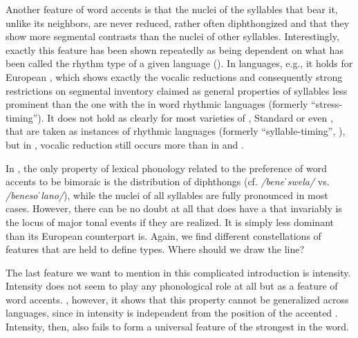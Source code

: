 \documentclass[output=paper]{LSP/langsci}
\begin{document}
Another feature of word accents is that the nuclei of the syllables that bear it, unlike its neighbors, are never reduced, rather often diphthongized and that they show more segmental contrasts than the nuclei of other syllables. Interestingly, exactly this feature has been shown repeatedly as being dependent on what has been called the rhythm type of a given language (\citealt{Dauer1983,Auer1993,Auer2001,Dufter2003}). In  languages, e.g., it holds for European , which shows exactly the vocalic reductions and consequently strong restrictions on segmental inventory claimed as general properties of syllables less prominent than the one with the  in word rhythmic languages (formerly ``stress-timing''). It does not hold as clearly for most varieties of , Standard  or even , that are taken as instances of  rhythmic languages (formerly ``syllable-timing'', \citealt{Abaurre1998,Reich.2002}), but in , vocalic reduction still occurs more than in  and . 

In , the only property of lexical phonology related to the preference of word accents to be bimoraic is the distribution of diphthongs (cf. \textit{/beneˈswela/} vs. \textit{/benesoˈlano/}), while the nuclei of all syllables are fully pronounced in most cases. However, there can be no doubt at all that  does have a  that invariably is the locus of major tonal events if they are realized. It is simply less dominant than its European  counterpart is. Again, we find different constellations of features that are held to define types. Where should we draw the line?

The last feature we want to mention in this complicated introduction is intensity. Intensity does not seem to play any phonological role at all but as a feature of word accents. \citet[160]{Beckman1986}, however, it shows that this property cannot be generalized across languages, since in  intensity is independent from the position of the accented . Intensity, then, also fails to form a universal feature of the strongest  in the word. 
\end{document}

